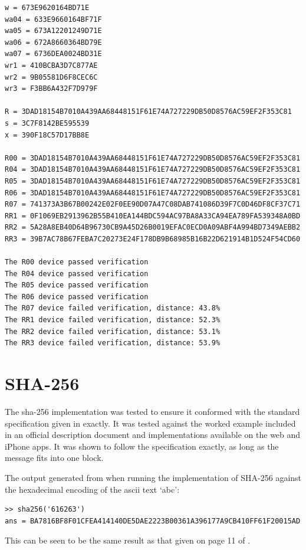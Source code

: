 \begin{verbatim}
w = 673E9620164BD71E
wa04 = 633E9660164BF71F
wa05 = 673A12201249D71E
wa06 = 672A8660364BD79E
wa07 = 6736DEA0024BD31E
wr1 = 410BCBA3D7C877AE
wr2 = 9B05581D6F8CEC6C
wr3 = F3BB6A432F7D979F

R = 3DAD18154B7010A439AA68448151F61E74A727229DB50D8576AC59EF2F353C81
s = 3C7F8142BE595539
x = 390F18C57D17BB8E

R00 = 3DAD18154B7010A439AA68448151F61E74A727229DB50D8576AC59EF2F353C81
R04 = 3DAD18154B7010A439AA68448151F61E74A727229DB50D8576AC59EF2F353C81
R05 = 3DAD18154B7010A439AA68448151F61E74A727229DB50D8576AC59EF2F353C81
R06 = 3DAD18154B7010A439AA68448151F61E74A727229DB50D8576AC59EF2F353C81
R07 = 741373A3B67B00242E02F0EE90D07A47C08DAB741086D39F7C0D46DF8CF37C71
RR1 = 0F1069EB2913962B55B410EA144BDC594AC97BA8A33CA94EA789FA539348A0BD
RR2 = 5A28A8EB40D64B96730CB9A45D26B0019EFAC0ECD0A09ABF4A994BD7349AEBB2
RR3 = 39B7AC78B67FEBA7C20273E24F178DB9B68985B16B22D621914B1D524F54CD60

The R00 device passed verification
The R04 device passed verification
The R05 device passed verification
The R06 device passed verification
The R07 device failed verification, distance: 43.8%
The RR1 device failed verification, distance: 52.3%
The RR2 device failed verification, distance: 53.1%
The RR3 device failed verification, distance: 53.9%
\end{verbatim}

\section{SHA-256}

The sha-256 implementation was tested to ensure it conformed with the standard
specification given in \cite{fips2001180} exactly. It was tested against the
worked example included in an official description document\cite{shsnist} and
implementations available on the web and iPhone apps. It was shown to follow
the specification exactly, as long as the message fits into one block.

The output generated from \matlab when running the implementation of SHA-256
against the hexadecimal encoding of the \gls{ascii} text `abc':

\begin{verbatim}
>> sha256('616263')
ans = BA7816BF8F01CFEA414140DE5DAE2223B00361A396177A9CB410FF61F20015AD
\end{verbatim}

This can be seen to be the same result as that given on page 11 of \cite{shsnist}.


